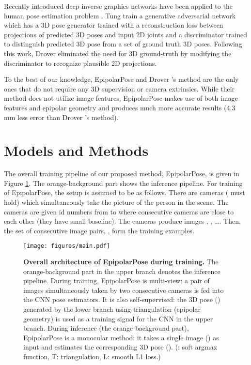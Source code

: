 \documentclass[10pt,twocolumn,letterpaper]{article}
\begin{document}
Recently introduced deep inverse graphics networks \cite{kulkarni,3dinterpreter} have been applied to the human pose estimation problem \cite{tung2017, drover2018}. Tung \etal \cite{tung2017} train a generative adversarial network which has a 3D pose generator trained with a reconstruction loss between projections of predicted 3D poses and input 2D joints and a discriminator trained to distinguish predicted 3D pose from a set of ground truth 3D poses. Following this work, Drover \etal \cite{drover2018} eliminated the need for 3D ground-truth by modifying the discriminator to recognize plausible 2D projections. 

To the best of our knowledge, EpipolarPose and Drover \etal’s method are the only ones that do not require any 3D supervision or camera extrinsics. While their method does not utilize image features, EpipolarPose makes use of both image features and epipolar geometry and produces much more accurate results (4.3 mm less error than Drover \etal’s method).
\section{Models and Methods}
The overall training pipeline of our proposed method, EpipolarPose, is given in Figure \ref{fig:self}. The orange-background part shows the inference pipeline. For training of EpipolarPose, the setup is assumed to be as follows. There are  cameras ( must hold) which simultaneously take the picture of the person in the scene. The cameras are given id numbers from  to  where consecutive cameras are close to each other (\ie they have small baseline). The cameras produce images , , \dots . Then, the set of consecutive image pairs, , form the training examples. 


\begin{figure}
\centering
\texttt{[image: figures/main.pdf]}
\caption{\textbf{Overall architecture of EpipolarPose during training.} The orange-background part in the upper branch denotes the inference pipeline. During training, EpipolarPose is multi-view: a pair of images  simultaneously taken by two consecutive cameras is fed into the CNN pose estimators. It is also self-supervised: the 3D pose () generated by the lower branch using triangulation (\ie epipolar geometry) is used as a training signal for the CNN in the upper branch. During inference (the orange-background part), EpipolarPose is a monocular method: it takes a single image () as input and estimates the corresponding 3D pose (). (: soft argmax function, T: triangulation, L: smooth L1 loss.) }
\label{fig:self}
\end{figure}
\end{document}
